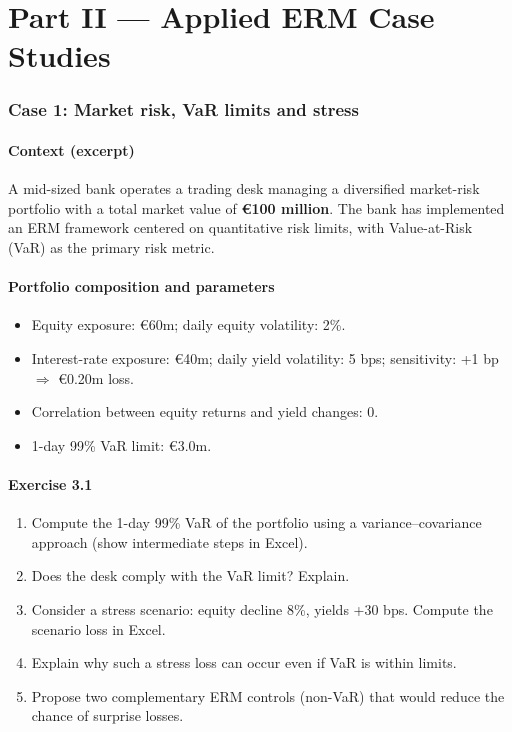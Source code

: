 \documentclass[11pt]{article}
\begin{document}
\newpage
\part*{Part II --- Applied ERM Case Studies}

\section{Case 1: Market risk, VaR limits and stress}
\subsection*{Context (excerpt)}
A mid-sized bank operates a trading desk managing a diversified market-risk portfolio with a total market value of \textbf{€100 million}. The bank has implemented an ERM framework centered on quantitative risk limits, with Value-at-Risk (VaR) as the primary risk metric.

\subsection*{Portfolio composition and parameters}
\begin{itemize}
  \item Equity exposure: \euro 60m; daily equity volatility: 2\%.
  \item Interest-rate exposure: \euro 40m; daily yield volatility: 5 bps; sensitivity: +1 bp $\Rightarrow$ \euro 0.20m loss.
  \item Correlation between equity returns and yield changes: 0.
  \item 1-day 99\% VaR limit: \euro 3.0m.
\end{itemize}

\subsection*{Exercise 3.1}
\begin{enumerate}
  \item Compute the 1-day 99\% VaR of the portfolio using a variance--covariance approach (show intermediate steps in Excel).
  \item Does the desk comply with the VaR limit? Explain.
  \item Consider a stress scenario: equity decline 8\%, yields +30 bps. Compute the scenario loss in Excel.
  \item Explain why such a stress loss can occur even if VaR is within limits.
  \item Propose two complementary ERM controls (non-VaR) that would reduce the chance of surprise losses.
\end{enumerate}
\end{document}
